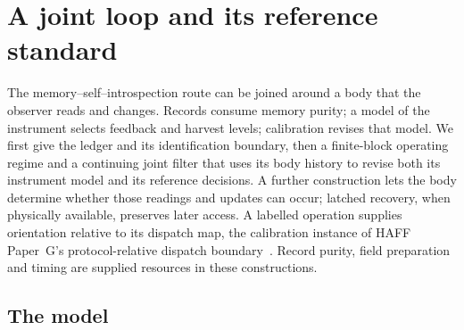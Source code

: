\documentclass[12pt]{article}
\theoremstyle{definition}
\begin{document}
\section{A joint loop and its reference standard}
\label{sec:autonomous}

The memory--self--introspection route can be joined around a body that the observer reads and changes. Records consume memory purity; a model of the instrument selects feedback and harvest levels; calibration revises that model. We first give the ledger and its identification boundary, then a finite-block operating regime and a continuing joint filter that uses its body history to revise both its instrument model and its reference decisions. A further construction lets the body determine whether those readings and updates can occur; latched recovery, when physically available, preserves later access. A labelled operation supplies orientation relative to its dispatch map, the calibration instance of HAFF Paper~G's protocol-relative dispatch boundary~\cite{Liu2026HAFF_G}. Record purity, field preparation and timing are supplied resources in these constructions.

\subsection{The model}
\label{subsec:J_model}
\end{document}
